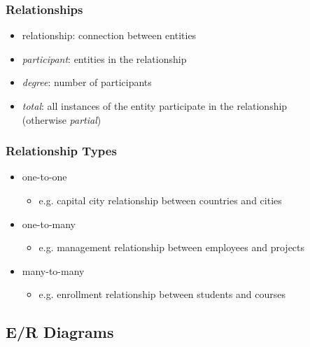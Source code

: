 \documentclass[dvipsnames]{beamer}
\begin{document}
\begin{frame}
  \frametitle{Relationships}

  \begin{itemize}
    \item \alert{relationship}: connection between entities

    \medskip
    \item \emph{participant}: entities in the relationship
    \item \emph{degree}: number of participants
    \item \emph{total}: all instances of the entity
      participate in the relationship\\
      (otherwise \emph{partial})
  \end{itemize}
\end{frame}

\begin{frame}
  \frametitle{Relationship Types}

  \begin{itemize}
    \item \alert{one-to-one}
    \begin{itemize}
      \item e.g. capital city relationship between countries and cities
    \end{itemize}

    \pause
    \medskip
    \item \alert{one-to-many}
    \begin{itemize}
      \item e.g. management relationship between employees and projects
    \end{itemize}

    \pause
    \medskip
    \item \alert{many-to-many}
    \begin{itemize}
      \item e.g. enrollment relationship between students and courses
    \end{itemize}
  \end{itemize}
\end{frame}

\subsection{E/R Diagrams}
\end{document}
